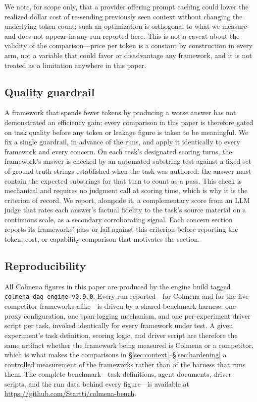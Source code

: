 We note, for scope only, that a provider offering prompt caching could
lower the realized dollar cost of re-sending previously seen context
without changing the underlying token count; such an optimization is
orthogonal to what we measure and does not appear in any run reported
here. This is not a caveat about the validity of the comparison---price
per token is a constant by construction in every arm, not a variable that
could favor or disadvantage any framework, and it is not treated as a
limitation anywhere in this paper.

\subsection{Quality guardrail}
\label{subsec:method-guardrail}

A framework that spends fewer tokens by producing a worse answer has not
demonstrated an efficiency gain; every comparison in this paper is
therefore gated on task quality before any token or leakage figure is
taken to be meaningful. We fix a single guardrail, in advance of the runs,
and apply it identically to every framework and every concern. On each
task's designated scoring turns, the framework's answer is checked by an
automated substring test against a fixed set of ground-truth strings
established when the task was authored: the answer must contain the
expected substrings for that turn to count as a pass. This check is
mechanical and requires no judgment call at scoring time, which is why it
is the criterion of record. We report, alongside it, a complementary score
from an LLM judge that rates each answer's factual fidelity to the task's
source material on a continuous scale, as a secondary corroborating
signal. Each concern section reports its frameworks' pass or fail against
this criterion before reporting the token, cost, or capability comparison
that motivates the section.

\subsection{Reproducibility}
\label{subsec:method-repro}

All Colmena figures in this paper are produced by the engine build tagged
\texttt{colmena\_dag\_engine-v0.9.0}. Every run reported---for Colmena and
for the five competitor frameworks alike---is driven by a shared benchmark
harness: one proxy configuration, one span-logging mechanism, and one
per-experiment driver script per task, invoked identically for every
framework under test. A given experiment's task definition, scoring
logic, and driver script are therefore the same artifact whether the
framework being measured is Colmena or a competitor, which is what makes
the comparisons in \S\ref{sec:context}--\S\ref{sec:hardening} a controlled
measurement of the frameworks rather than of the harness that runs them.
The complete benchmark---task definitions, agent documents, driver
scripts, and the run data behind every figure---is available at
\url{https://github.com/Startti/colmena-bench}.

